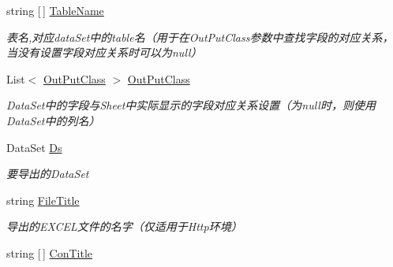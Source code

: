 \begin{DoxyCompactItemize}
\item 
string \mbox{[}$\,$\mbox{]} \hyperlink{class_x_c_l_net_tools_1_1_entity_1_1_office_1_1_excel_handler_1_1_out_put_param_class_a0a911a788ec6d71dd31abd3624400b67}{Table\+Name}
\begin{DoxyCompactList}\small\item\em 表名,对应data\+Set中的table名（用于在\+Out\+Put\+Class参数中查找字段的对应关系，当没有设置字段对应关系时可以为null） \end{DoxyCompactList}\item 
List$<$ \hyperlink{class_x_c_l_net_tools_1_1_entity_1_1_office_1_1_excel_handler_1_1_out_put_class}{Out\+Put\+Class} $>$ \hyperlink{class_x_c_l_net_tools_1_1_entity_1_1_office_1_1_excel_handler_1_1_out_put_param_class_adc8f68c8e223e5653d29efabacc56b65}{Out\+Put\+Class}
\begin{DoxyCompactList}\small\item\em Data\+Set中的字段与\+Sheet中实际显示的字段对应关系设置（为null时，则使用\+Data\+Set中的列名） \end{DoxyCompactList}\item 
Data\+Set \hyperlink{class_x_c_l_net_tools_1_1_entity_1_1_office_1_1_excel_handler_1_1_out_put_param_class_a3f2d60db6c0602122169dd392caed6c0}{Ds}
\begin{DoxyCompactList}\small\item\em 要导出的\+Data\+Set \end{DoxyCompactList}\item 
string \hyperlink{class_x_c_l_net_tools_1_1_entity_1_1_office_1_1_excel_handler_1_1_out_put_param_class_a9825b6c0aa98a7e758376b5de8af1991}{File\+Title}
\begin{DoxyCompactList}\small\item\em 导出的\+E\+X\+C\+E\+L文件的名字（仅适用于\+Http环境） \end{DoxyCompactList}\item 
string \mbox{[}$\,$\mbox{]} \hyperlink{class_x_c_l_net_tools_1_1_entity_1_1_office_1_1_excel_handler_1_1_out_put_param_class_a0acbd053010430b65a37f7c0b28e122e}{Con\+Title}

\end{DoxyCompactItemize}
